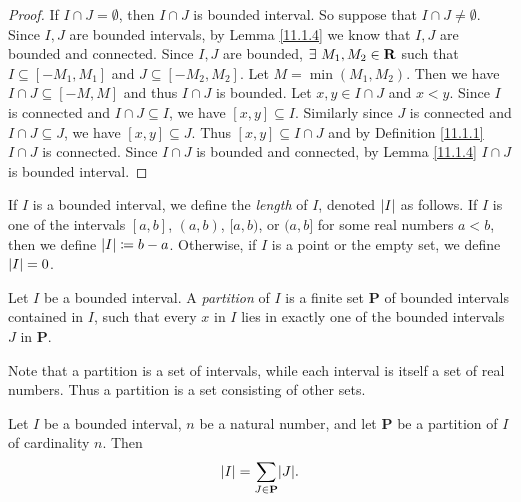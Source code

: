 \begin{proof}
    If \(I \cap J = \emptyset\), then \(I \cap J\) is bounded interval.
    So suppose that \(I \cap J \neq \emptyset\).
    Since \(I, J\) are bounded intervals, by Lemma \ref{11.1.4} we know that \(I, J\) are bounded and connected.
    Since \(I, J\) are bounded, \(\exists\ M_1, M_2 \in \mathbf{R}\) such that \(I \subseteq [-M_1, M_1]\) and \(J \subseteq [-M_2, M_2]\).
    Let \(M = \min(M_1, M_2)\).
    Then we have \(I \cap J \subseteq [-M, M]\) and thus \(I \cap J\) is bounded.
    Let \(x, y \in I \cap J\) and \(x < y\).
    Since \(I\) is connected and \(I \cap J \subseteq I\), we have \([x, y] \subseteq I\).
    Similarly since \(J\) is connected and \(I \cap J \subseteq J\), we have \([x, y] \subseteq J\).
    Thus \([x, y] \subseteq I \cap J\) and by Definition \ref{11.1.1} \(I \cap J\) is connected.
    Since \(I \cap J\) is bounded and connected, by Lemma \ref{11.1.4} \(I \cap J\) is bounded interval.
\end{proof}

\setcounter{theorem}{7}
\begin{definition}\label{11.1.8}
    If \(I\) is a bounded interval, we define the \emph{length} of \(I\), denoted \(\left\lvert I\right\rvert\) as follows.
    If \(I\) is one of the intervals \([a, b]\), \((a, b)\), \([a, b)\), or \((a, b]\) for some real numbers \(a < b\), then we define \(\left\lvert I\right\rvert \coloneqq b - a\).
    Otherwise, if \(I\) is a point or the empty set, we define \(\left\lvert I\right\rvert = 0\).
\end{definition}

\setcounter{theorem}{9}
\begin{definition}[Partitions]\label{11.1.10}
    Let \(I\) be a bounded interval.
    A \emph{partition} of \(I\) is a finite set \(\mathbf{P}\) of bounded intervals contained in \(I\), such that every \(x\) in \(I\) lies in exactly one of the bounded intervals \(J\) in \(\mathbf{P}\).
\end{definition}

\begin{remark}\label{11.1.11}
    Note that a partition is a set of intervals, while each interval is itself a set of real numbers.
    Thus a partition is a set consisting of other sets.
\end{remark}

\setcounter{theorem}{12}
\begin{theorem}\label{11.1.13}
    Let \(I\) be a bounded interval, \(n\) be a natural number, and let \(\mathbf{P}\) be a partition of \(I\) of cardinality \(n\).
    Then
    \[
        \abs{I} = \sum_{J \in \mathbf{P}} \abs{J}.
    \]
\end{theorem}

